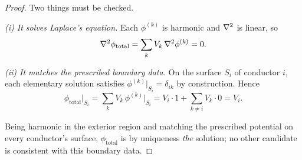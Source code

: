 \begin{proof}
Two things must be checked.

\emph{(i) It solves Laplace's equation.} Each $\phi^{(k)}$ is harmonic and $\laplacian$ is linear, so
\[
    \laplacian\phi_\text{total} = \sum_k V_k\,\laplacian\phi^{(k)} = 0 .
\]

\emph{(ii) It matches the prescribed boundary data.} On the surface $S_i$ of conductor $i$, each elementary solution satisfies $\phi^{(k)}\big|_{S_i} = \delta_{ik}$ by construction. Hence
\[
    \phi_\text{total}\Big|_{S_i} = \sum_k V_k\,\phi^{(k)}\Big|_{S_i} = V_i\cdot 1 + \sum_{k\neq i} V_k\cdot 0 = V_i .
\]

Being harmonic in the exterior region and matching the prescribed potential on every conductor's surface, $\phi_\text{total}$ is by uniqueness \emph{the} solution; no other candidate is consistent with this boundary data.
\end{proof}

